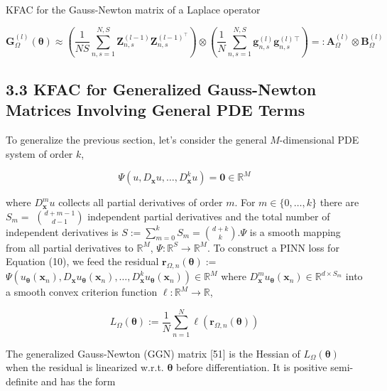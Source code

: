 \documentclass[10pt]{article}
\begin{document}
KFAC for the Gauss-Newton matrix of a Laplace operator


\begin{equation*}
\boldsymbol{G}_{\Omega}^{(l)}(\boldsymbol{\theta}) \approx\left(\frac{1}{N S} \sum_{n, s=1}^{N, S} \boldsymbol{Z}_{n, s}^{(l-1)} \boldsymbol{Z}_{n, s}^{(l-1)^{\top}}\right) \otimes\left(\frac{1}{N} \sum_{n, s=1}^{N, S} \boldsymbol{g}_{n, s}^{(l)} \boldsymbol{g}_{n, s}^{(l)}{ }^{\top}\right)=: \boldsymbol{A}_{\Omega}^{(l)} \otimes \boldsymbol{B}_{\Omega}^{(l)} \tag{9}
\end{equation*}


\subsection*{3.3 KFAC for Generalized Gauss-Newton Matrices Involving General PDE Terms}
To generalize the previous section, let's consider the general $M$-dimensional PDE system of order $k$,


\begin{equation*}
\Psi\left(u, D_{\boldsymbol{x}} u, \ldots, D_{\boldsymbol{x}}^{k} u\right)=\mathbf{0} \in \mathbb{R}^{M} \tag{10}
\end{equation*}


where $D_{\boldsymbol{x}}^{m} u$ collects all partial derivatives of order $m$. For $m \in\{0, \ldots, k\}$ there are $S_{m}=$ $\binom{d+m-1}{d-1}$ independent partial derivatives and the total number of independent derivatives is $S:=\sum_{m=0}^{k} S_{m}=\binom{d+k}{k} . \Psi$ is a smooth mapping from all partial derivatives to $\mathbb{R}^{M}$, $\Psi: \mathbb{R}^{S} \rightarrow \mathbb{R}^{M}$. To construct a PINN loss for Equation (10), we feed the residual $\boldsymbol{r}_{\Omega, n}(\boldsymbol{\theta}):=$ $\Psi\left(u_{\boldsymbol{\theta}}\left(\boldsymbol{x}_{n}\right), D_{\boldsymbol{x}} u_{\boldsymbol{\theta}}\left(\boldsymbol{x}_{n}\right), \ldots, D_{\boldsymbol{x}}^{k} u_{\boldsymbol{\theta}}\left(\boldsymbol{x}_{n}\right)\right) \in \mathbb{R}^{M}$ where $D_{\boldsymbol{x}}^{m} u_{\boldsymbol{\theta}}\left(\boldsymbol{x}_{n}\right) \in \mathbb{R}^{d \times S_{m}}$ into a smooth convex criterion function $\ell: \mathbb{R}^{M} \rightarrow \mathbb{R}$,


\begin{equation*}
L_{\Omega}(\boldsymbol{\theta}):=\frac{1}{N} \sum_{n=1}^{N} \ell\left(\boldsymbol{r}_{\Omega, n}(\boldsymbol{\theta})\right) \tag{11}
\end{equation*}


The generalized Gauss-Newton (GGN) matrix [51] is the Hessian of $L_{\Omega}(\boldsymbol{\theta})$ when the residual is linearized w.r.t. $\boldsymbol{\theta}$ before differentiation. It is positive semi-definite and has the form
\end{document}
